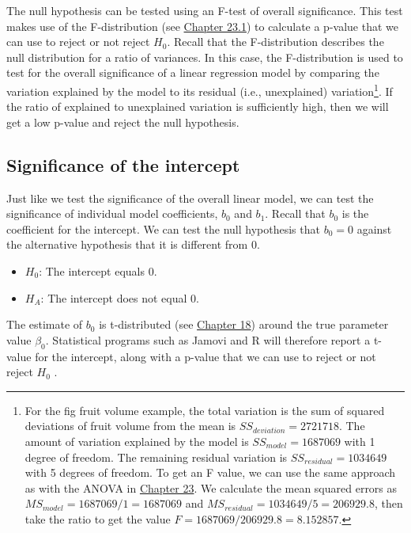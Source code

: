 \documentclass[
]{scrbook}
\providecommand{\tightlist}{%
  \setlength{\itemsep}{0pt}\setlength{\parskip}{0pt}}
\begin{document}
The null hypothesis can be tested using an F-test of overall significance.
This test makes use of the F-distribution (see \protect\hyperlink{the-f-distribution}{Chapter 23.1}) to calculate a p-value that we can use to reject or not reject \(H_{0}\).
Recall that the F-distribution describes the null distribution for a ratio of variances.
In this case, the F-distribution is used to test for the overall significance of a linear regression model by comparing the variation explained by the model to its residual (i.e., unexplained) variation\footnote{For the fig fruit volume example, the total variation is the sum of squared deviations of fruit volume from the mean is \(SS_{deviation} = 2721718\). The amount of variation explained by the model is \(SS_{model} = 1687069\) with 1 degree of freedom. The remaining residual variation is \(SS_{residual} = 1034649\) with 5 degrees of freedom. To get an F value, we can use the same approach as with the ANOVA in \protect\hyperlink{Chapter_23}{Chapter 23}. We calculate the mean squared errors as \(MS_{model} = 1687069/1 = 1687069\) and \(MS_{residual} = 1034649/5 = 206929.8\), then take the ratio to get the value \(F = 1687069 / 206929.8 = 8.152857\).}.
If the ratio of explained to unexplained variation is sufficiently high, then we will get a low p-value and reject the null hypothesis.

\hypertarget{significance-of-the-intercept}{%
\subsection{Significance of the intercept}\label{significance-of-the-intercept}}

Just like we test the significance of the overall linear model, we can test the significance of individual model coefficients, \(b_{0}\) and \(b_{1}\).
Recall that \(b_{0}\) is the coefficient for the intercept.
We can test the null hypothesis that \(b_{0} = 0\) against the alternative hypothesis that it is different from 0.

\begin{itemize}
\tightlist
\item
  \(H_{0}\): The intercept equals 0.
\item
  \(H_{A}\): The intercept does not equal 0.
\end{itemize}

The estimate of \(b_{0}\) is t-distributed (see \protect\hyperlink{Chapter_18}{Chapter 18}) around the true parameter value \(\beta_{0}\).
Statistical programs such as Jamovi and R will therefore report a t-value for the intercept, along with a p-value that we can use to reject or not reject \(H_{0}\) \citep{Jamovi2022, Rproject}.
\end{document}
